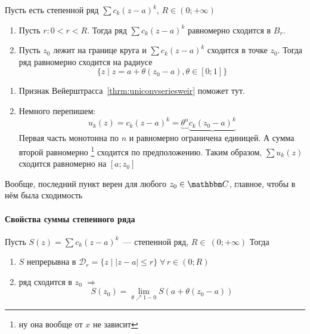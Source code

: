 \documentclass[12pt]{../../notes}
\begin{document}
\begin{thrm}\label{thrm:uniconvpowerseries}
  Пусть есть степенной ряд $\sum c_k (z-a)^k$, $R\in(0;+\infty)$
  \begin{enumerate}
    \item Пусть $r\colon 0 < r < R$. Тогда ряд $\sum c_k (z-a)^k$ равномерно сходится в $B_r$.
    \item Пусть $z_0$ лежит на границе круга и $\sum c_k (z-a)^k$ сходится в точке $z_0$.
      Тогда ряд равномерно сходится на радиусе
      \[
        \{ z \mid z = a + \theta(z_0 - a), \theta \in [0;1] \}
      \]
  \end{enumerate}
\end{thrm}
\begin{ittproof}
  \begin{enumerate}
    \item Признак Вейерштрасса~\ref{thrm:uniconvseriesweir} поможет тут.
    \item Немного перепишем:
      \[
        u_k(z) =  c_k(z-a)^k = \underbrace{\theta^n} \underbrace{c_k (z_0 - a)^k} 
      \]
      Первая часть монотонна по $n$ и равномерно ограничена единицей. А сумма второй равномерно
      \footnote{ну она вообще от $x$ не зависит} сходится по предположению. Таким образом, 
      $\sum u_k(z)$ сходится равномерно на $[a;z_0]$
  \end{enumerate}
\end{ittproof}

\begin{rem*}
  Вообще, последний пункт верен для любого $z_0\in \C$, главное, чтобы в нём была сходимость
\end{rem*}

\paragraph{Свойства суммы степенного ряда}

\begin{thrm}\label{thrm:powerseriescont}
  Пусть $S(z) = \sum c_k (z-a)^k$~--- степенной ряд, $R\in~(0;+\infty)$
  Тогда
  \begin{enumerate}
    \item $S$ непрерывна в $\mathcal{D}_r = \{z \mid |z-a|\leqslant r\}\; \forall\, r\in (0;R)$
    \item ряд сходится в $z_0$ $\Rightarrow$ 
      \[
        S(z_0) = \lim_{\theta \nearrow 1-0} S(a + \theta(z_0-a))
      \]
  \end{enumerate}
\end{thrm}
\end{document}
